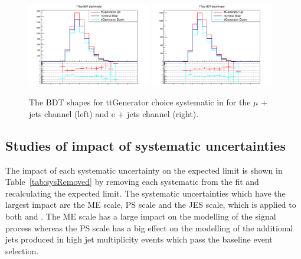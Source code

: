 \begin{figure}[ht!]
    \includegraphics[width=0.48\textwidth]{images/Run2/Sys/ttGeneratorsystt.pdf}
    \includegraphics[width=0.48\textwidth]{images/Run2/Sys/ttGeneratorsystt_e.pdf}     
    \caption{The BDT shapes for ttGenerator choice systematic in \ttbar for the $\mu$ + jets channel (left) and e + jets channel (right).}
    \label{fig:SysShapesttGen}
\end{figure}


\subsection{Studies of impact of systematic uncertainties \label{app:sysminusone}}

The impact of each systematic uncertainty on the expected limit is shown in Table~\ref{tab:sysRemoved} by removing each systematic from the fit and recalculating the expected limit. The systematic uncertainties which have the largest impact are the \ttbar ME scale, \ttbar PS scale and the JES scale, which is applied to both \ttbar and \tttt. The \ttbar ME scale has a large impact on the modelling of the signal process whereas the \ttbar PS scale has a big effect on the modelling of the additional jets produced in high jet multiplicity \ttbar events which pass the baseline event selection.


